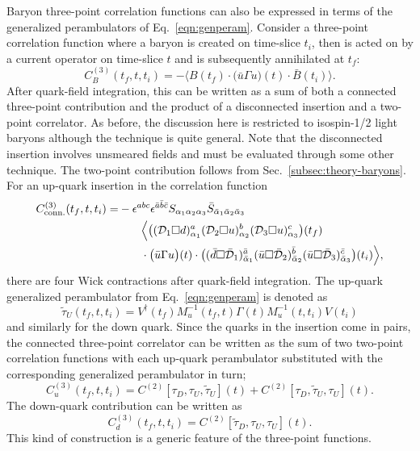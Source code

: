 Baryon three-point correlation functions can also be expressed in terms of
the generalized perambulators of Eq.~\ref{eqn:genperam}.
Consider a three-point correlation function where a baryon is created on
time-slice $t_i$, then is acted on by a current operator on time-slice $t$ and
is subsequently annihilated at $t_f$:
\begin{equation}
   C^{(3)}_B(t_f, t, t_i) = - \Big\langle B(t_f)\cdot \big(\bar{u}\Gamma u \big)(t) \cdot \bar{B}(t_i) \Big\rangle.
\end{equation}
After quark-field integration, this can be written as a sum of both
a connected three-point contribution
and the product of a disconnected insertion and a two-point correlator.
As before, the discussion here is restricted to isospin-1/2 light baryons
although the technique is quite general.
Note that the disconnected insertion involves unsmeared fields and must be
evaluated through some other technique. The two-point contribution follows
from Sec.~\ref{subsec:theory-baryons}.
For an up-quark insertion in the correlation function
\begin{equation}
\begin{split}
   C^{(3)}_\mathrm{conn.}(t_f, t, t_i) =& -\epsilon^{abc}\epsilon^{\bar{a}\bar{b}\bar{c}} S_{\alpha_1\alpha_2 \alpha_3} \bar{S}_{\bar{\alpha}_1 \bar{\alpha}_2 \bar{\alpha}_3}\\
&\quad\quad\Big\langle \big(
({\cal D}_1\Box d)^a_{\alpha_1}
({\cal D}_2\Box u)^b_{\alpha_2}
({\cal D}_3\Box u)^c_{\alpha_3} \big)(t_f)\\&\quad\quad\cdot
\big(\bar{u}\Gamma u\big)(t)
\cdot \big( (\bar d\Box\bar{\cal D}_1)^{\bar{a}}_{\bar\alpha_1}
(\bar u\Box\bar{\cal D}_2)^{\bar{b}}_{\bar\alpha_2}
(\bar u\Box\bar{\cal D}_3)^{\bar{c}}_{\bar\alpha_3}\big)(t_i)
\Big\rangle,
\end{split}
\end{equation}
there are four Wick contractions after quark-field integration.
The up-quark generalized perambulator from Eq.~\ref{eqn:genperam}
is denoted as
\begin{equation}
\widetilde{\tau}_U(t_f,t,t_i)  =
V^\dagger(t_f) M_u^{-1}(t_f,t)\Gamma(t) M_u^{-1}(t,t_i) V(t_i)
\end{equation}
and similarly for the down quark. Since the quarks in the insertion
come in pairs, the connected three-point correlator can be written as the
sum of two two-point correlation functions
with each up-quark perambulator substituted with the corresponding
generalized perambulator in turn;
\begin{equation}
C^{(3)}_u(t_f,t,t_i) = C^{(2)}[\tau_D,\tau_U,\widetilde{\tau}_U](t) +
C^{(2)}[\tau_D,\widetilde{\tau}_U,\tau_U](t).
\end{equation}
The down-quark contribution can be written as
\begin{equation}
C^{(3)}_d(t_f,t,t_i) = C^{(2)}[\widetilde{\tau}_D,\tau_U,\tau_U](t).
\end{equation}
This kind of construction is a generic feature of the three-point functions.


